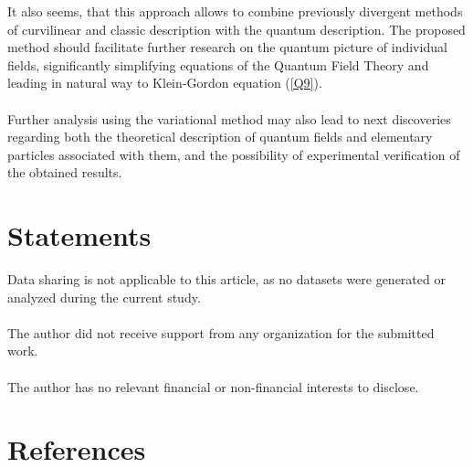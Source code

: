 \documentclass[aps,prx,preprint,groupedaddress,showkeys]{revtex4-2}
\begin{document}
It also seems, that this approach allows to combine previously divergent methods of curvilinear and classic description with the quantum description. The proposed method should facilitate further research on the quantum picture of individual fields, significantly simplifying equations of the Quantum Field Theory and leading in natural way to Klein-Gordon equation (\ref{Q9}).\\
~\\
Further analysis using the variational method may also lead to next discoveries regarding both the theoretical description of quantum fields and elementary particles associated with them, and the possibility of experimental verification of the obtained results.

\section{Statements} \label{4Chap}

Data sharing is not applicable to this article, as no datasets were generated or analyzed during the current study.\\
~\\
The author did not receive support from any organization for the submitted work.\\
~\\
The author has no relevant financial or non-financial interests to disclose.\\


\section*{References}


\end{document}
